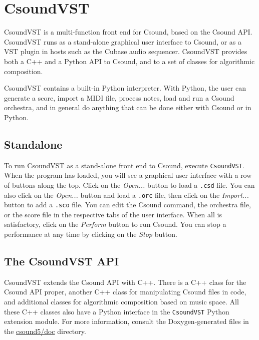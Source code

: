 \documentclass[10pt,letterpaper,onecolumn]{book}
\begin{document}
%
%

\section{CsoundVST}

CsoundVST is a multi-function front end for Csound, based on the Csound API. CsoundVST runs as a stand-alone graphical user interface to Csound, or as a VST plugin in hosts such as the Cubase audio sequencer. CsoundVST provides both a C++ and a Python API to Csound, and to a set of classes for algorithmic composition. 

CsoundVST contains a built-in Python interpreter. With Python, the user can generate a score, import a MIDI file, process notes, load and run a Csound orchestra, and in general do anything that can be done either with Csound or in Python.

\subsection{Standalone}

To run CsoundVST as a stand-alone front end to Csound, execute \texttt{CsoundVST}. When the program has loaded, you will see a graphical user interface with a row of buttons along the top. Click on the \emph{Open...} button to load a \texttt{.csd} file. You can also click on the \emph{Open...} button and load a \texttt{.orc} file, then click on the \emph{Import...} button to add a \texttt{.sco} file. You can edit the Csound command, the orchestra file, or the score file in the respective tabs of the user interface. When all is satisfactory, click on the \emph{Perform} button to run Csound. You can stop a performance at any time by clicking on the \emph{Stop} button.

\subsection{The CsoundVST API}

CsoundVST extends the Csound API with C++. There is a C++ class for the Csound API proper, another C++ class for manipulating Csound files in code, and additional classes for algorithmic composition based on music space. All these C++ classes also have a Python interface in the \texttt{CsoundVST} Python extension module. For more information, consult the Doxygen-generated files in the \url{csound5/doc} directory.
\end{document}
